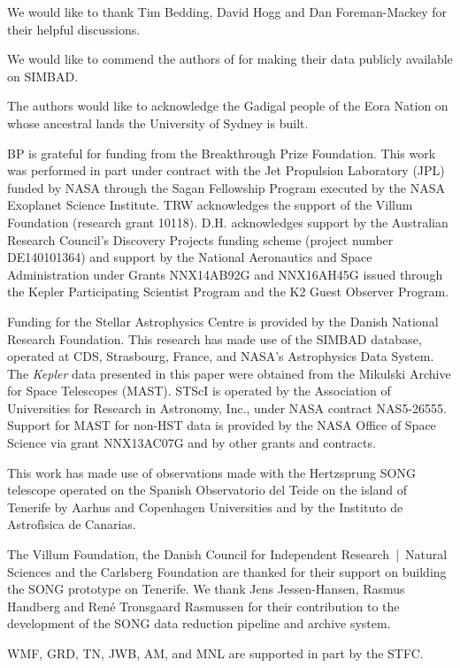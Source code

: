 \documentclass[modern]{aastex61}
\newcommand{\kepler}{\emph{Kepler}\xspace}
\begin{document}
\acknowledgments

We would like to thank Tim Bedding, David Hogg and Dan Foreman-Mackey for their helpful discussions.

We would like to commend the authors of \citet{Hatzes2015} for making their data
publicly available on SIMBAD.

The authors would like to acknowledge the Gadigal people of the Eora Nation on whose ancestral lands the University of Sydney is built.

BP is grateful for funding from the Breakthrough Prize Foundation. This work was performed in part under contract with the Jet Propulsion Laboratory (JPL) funded by NASA through the Sagan Fellowship Program executed by the NASA Exoplanet Science Institute.
TRW acknowledges the support of the Villum Foundation (research grant 10118).
D.H. acknowledges support by the Australian Research Council's Discovery Projects funding scheme (project number DE140101364) and support by the National Aeronautics and Space Administration under Grants NNX14AB92G and NNX16AH45G issued through the Kepler Participating Scientist Program and the K2 Guest Observer Program.

Funding for the Stellar Astrophysics Centre is provided by the Danish National Research Foundation.
This research has made use of the SIMBAD database, operated at CDS, Strasbourg, France, and NASA's Astrophysics Data System. The \kepler data presented in this paper were obtained from the Mikulski Archive for Space Telescopes (MAST). STScI is operated by the Association of Universities for Research in Astronomy, Inc., under NASA contract NAS5-26555. Support for MAST for non-HST data is provided by the NASA Office of Space Science via grant NNX13AC07G and by other grants and contracts.

This work has made use of observations made with the Hertzsprung SONG telescope operated on the Spanish Observatorio
  del Teide on the island of Tenerife by Aarhus and Copenhagen Universities and by the Instituto de
  Astrof\`{i}sica de Canarias.

The Villum Foundation, the Danish Council for Independent Research~|~Natural Sciences and
 the Carlsberg Foundation are thanked for their support on building the SONG prototype on
 Tenerife.
 We thank Jens Jessen-Hansen, Rasmus Handberg and René Tronsgaard Rasmussen for their contribution
 to the development of the SONG data reduction pipeline and archive system.

 WMF, GRD, TN, JWB, AM, and MNL are supported in part by the STFC.
\end{document}
